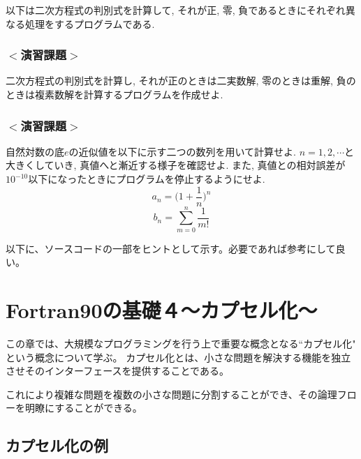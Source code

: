 \documentclass[a4j]{jsbook}
\begin{document}
以下は二次方程式の判別式を計算して, それが正, 零, 負であるときにそれぞれ異なる処理をするプログラムである.


\subsection*{$<$演習課題$>$}
二次方程式の判別式を計算し, それが正のときは二実数解,
零のときは重解, 負のときは複素数解を計算するプログラムを作成せよ.

\subsection*{$<$演習課題$>$}
自然対数の底$e$の近似値を以下に示す二つの数列を用いて計算せよ.
$n=1, 2, \cdots$と大きくしていき, 真値へと漸近する様子を確認せよ.
また, 真値との相対誤差が$10^{-10}$以下になったときにプログラムを停止するようにせよ.
\begin{equation}
a_n= \Big( 1+\frac{1}{n}\Big)^n
\end{equation}
\begin{equation}
b_n=\sum_{m=0}^{n}\frac{1}{m!}
\end{equation}

以下に、ソースコードの一部をヒントとして示す。必要であれば参考にして良い。




\chapter{Fortran90の基礎４〜カプセル化〜}
この章では、大規模なプログラミングを行う上で重要な概念となる``カプセル化" という概念について学ぶ。
カプセル化とは、小さな問題を解決する機能を独立させそのインターフェースを提供することである。

これにより複雑な問題を複数の小さな問題に分割することができ、その論理フローを明瞭にすることができる。

\section{カプセル化の例}

\end{document}
